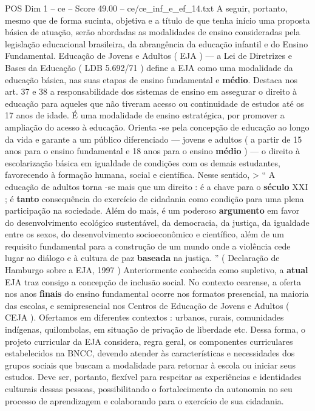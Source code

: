 \begin{textsample}{POS Dim 1 – ce – Score 49.00 – ce/ce\_inf\_e\_ef\_14.txt}
A seguir, portanto, mesmo que de forma sucinta, objetiva e a título de que tenha início uma proposta básica de atuação, serão abordadas as modalidades de ensino consideradas pela legislação educacional brasileira, da abrangência da educação infantil e do Ensino Fundamental.
Educação de Jovens e Adultos ( EJA ) — a Lei de Diretrizes e Bases da Educação ( LDB 5.692/71 ) define a EJA como uma modalidade da educação básica, nas suas etapas de ensino fundamental e \textbf{médio}.
Destaca nos art. 37 e 38 a responsabilidade dos sistemas de ensino em assegurar o direito à educação para aqueles que não tiveram acesso ou continuidade de estudos até os 17 anos de idade.
É uma modalidade de ensino estratégica, por promover a ampliação do acesso à educação.
Orienta -se pela concepção de educação ao longo da vida e garante a um público diferenciado — jovens e adultos ( a partir de 15 anos para o ensino fundamental e 18 anos para o ensino \textbf{médio} ) — o direito à escolarização básica em igualdade de condições com os demais estudantes, favorecendo à formação humana, social e científica.
Nesse sentido, > “ A educação de adultos torna -se mais que um direito : é a chave para o \textbf{século} XXI ; é \textbf{tanto} consequência do exercício de cidadania como condição para uma plena participação na sociedade.
Além do mais, é um poderoso \textbf{argumento} em favor do desenvolvimento ecológico sustentável, da democracia, da justiça, da igualdade entre os sexos, do desenvolvimento socioeconômico e científico, além de um requisito fundamental para a construção de um mundo onde a violência cede lugar ao diálogo e à cultura de paz \textbf{baseada} na justiça. ” ( Declaração de Hamburgo sobre a EJA, 1997 ) Anteriormente conhecida como supletivo, a \textbf{atual} EJA traz consigo a concepção de inclusão social.
No contexto cearense, a oferta nos anos \textbf{finais} do ensino fundamental ocorre nos formatos presencial, na maioria das escolas, e semipresencial nos Centros de Educação de Jovens e Adultos ( CEJA ).
Ofertamos em diferentes contextos : urbanos, rurais, comunidades indígenas, quilombolas, em situação de privação de liberdade etc.
Dessa forma, o projeto curricular da EJA considera, regra geral, os componentes curriculares estabelecidos na BNCC, devendo atender às características e necessidades dos grupos sociais que buscam a modalidade para retornar à escola ou iniciar seus estudos.
Deve ser, portanto, flexível para respeitar as experiências e identidades culturais dessas pessoas, possibilitando o fortalecimento da autonomia no seu processo de aprendizagem e colaborando para o exercício de sua cidadania.

\end{textsample}
